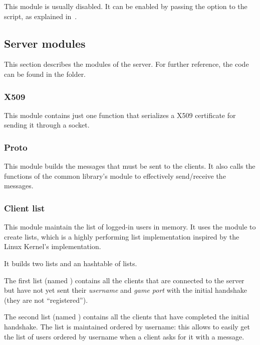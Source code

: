 This module is usually disabled. It can be enabled by passing the
 option to the  script, as explained
in~.


\subsection{Server modules}\label{subsec:servermod}

This section describes the modules of the server. For further reference, the
code can be found in the  folder.

\subsubsection{X509}

This module contains just one function that serializes a X509 certificate for
sending it through a socket.

\subsubsection{Proto}

This module builds the messages that must be sent to the clients. It also calls
the functions of the common library's  module to effectively
send/receive the messages.

\subsubsection{Client list}

This module maintain the list of logged-in users in memory. It uses the
 module to create lists, which is a highly performing list
implementation inspired by the Linux Kernel's  implementation.

It builds two lists and an hashtable of lists.

The first list (named ) contains all the clients that are
connected to the server but have not yet sent their \emph{username} and
\emph{game port} with the initial handshake (they are not ``registered'').

The second list (named ) contains all the clients that have
completed the initial handshake. The list is maintained ordered by username:
this allows to easily get the list of users ordered by username when a client
asks for it with a  message.

